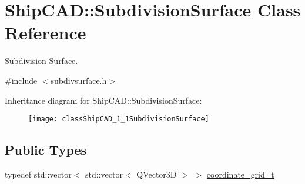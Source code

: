 \hypertarget{classShipCAD_1_1SubdivisionSurface}{}\section{Ship\+C\+AD\+:\+:Subdivision\+Surface Class Reference}
\label{classShipCAD_1_1SubdivisionSurface}


Subdivision Surface.  




{\ttfamily \#include $<$subdivsurface.\+h$>$}

Inheritance diagram for Ship\+C\+AD\+:\+:Subdivision\+Surface\+:\begin{figure}[H]
\begin{center}
\leavevmode
\texttt{[image: classShipCAD\_1\_1SubdivisionSurface]}
\end{center}
\end{figure}
\subsection*{Public Types}
\begin{DoxyCompactItemize}
\item 
typedef std\+::vector$<$ std\+::vector$<$ Q\+Vector3D $>$ $>$ \hyperlink{classShipCAD_1_1SubdivisionSurface_a8ed657cb7d4cd34662bd2d3e949d3e3b}{coordinate\+\_\+grid\+\_\+t}
\end{DoxyCompactItemize}
